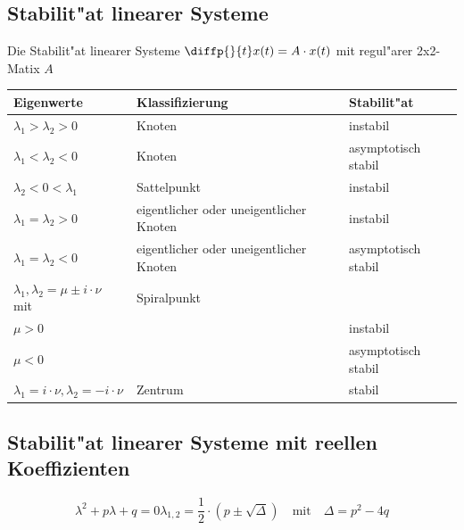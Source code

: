 \subsection{Stabilit"at linearer Systeme}
Die Stabilit"at linearer Systeme $\diffp{}{t}x(t) = A \cdot x(t)$ mit regul"arer 2x2-Matix $A$\\

\begin{tabular}{|l|l|l|}
	\hline
	\textbf{Eigenwerte}                                  & \textbf{Klassifizierung}                & \textbf{Stabilit"at} \\ \hline
	$\lambda_1 > \lambda_2 > 0$                          & Knoten                                  & instabil             \\ \hline
	$\lambda_1 < \lambda_2 < 0$                          & Knoten                                  & asymptotisch stabil  \\ \hline
	$\lambda_2 <  0 < \lambda_1 $                        & Sattelpunkt                             & instabil             \\ \hline
	$\lambda_1 = \lambda_2  > 0$                         & eigentlicher oder uneigentlicher Knoten & instabil             \\ \hline
	$\lambda_1 = \lambda_2 < 0$                          & eigentlicher oder uneigentlicher Knoten & asymptotisch stabil  \\ \hline
	$\lambda_1 , \lambda_2 = \mu \pm i \cdot \nu$ mit    & Spiralpunkt                             &  \\
	$\mu > 0$                                            &                                         & instabil             \\
	$\mu < 0$                                            &                                         & asymptotisch stabil  \\ \hline
	$\lambda_1 = i\cdot \nu ,  \lambda_2 = -i \cdot \nu$ & Zentrum                                 & stabil               \\ \hline
\end{tabular} 

\subsection{Stabilit"at linearer Systeme mit reellen Koeffizienten}
\begin{subequations}
	\begin{equation*}
		\lambda^2 + p \lambda + q = 0
	\end{equation*}
	\begin{equation*}
		\lambda_{1,2} = \frac{1}{2} \cdot (p \pm \sqrt{\Delta}) \quad \text{mit} \quad \Delta = p^2 -4q
	\end{equation*}
\end{subequations}\\ \\

